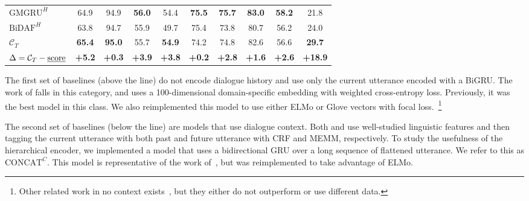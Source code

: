 \begin{table}[!htp]
\begin{center}
{\begin{tabular}{lccccccccc}
$\text{GMGRU}^{H}$                             & 64.9                 & 94.9                 & {\bf 56.0}           & 54.4             & {\bf 75.5}       & {\bf 75.7}       & {\bf 83.0}       & {\bf 58.2}       & 21.8             \\
$\text{BiDAF}^{H}$                             & 63.8                 & 94.7                 & 55.9                 & 49.7             & 75.4             & 73.8             & 80.7             & 56.2             & 24.0             \\ \midrule
$\mathcal{C}_{T}$                              & {\bf 65.4}           & {\bf 95.0}           & 55.7                 & {\bf 54.9}       & 74.2             & 74.8             & 82.6             & 56.6             & {\bf 29.7}       \\
$\Delta=\mathcal{C}_{T} - \text{\underline{score}}$ & {\bf +5.2} & {\bf +0.3} & {\bf +3.9} & {\bf +3.8} & {\bf +0.2} & {\bf +2.8} & {\bf +1.6} & {\bf +2.6} & {\bf +18.9}                                                                                                \\ \hline
\bottomrule
\end{tabular}}
\end{center}
\end{table}

The first set of baselines (above the line) do not encode dialogue
history and use only the current utterance encoded with a BiGRU. The
work of \citet{xiao2016behavioral} falls in this category, and uses a
100-dimensional domain-specific embedding with weighted cross-entropy
loss. Previously, it was the best model in this class. We also
reimplemented this model to use either ELMo or Glove vectors with
focal loss.~\footnote{Other related work in no context
  exists~\citep[\eg,][]{perez2017predicting, gibson2017attention}, but
  they either do not outperform \citet{xiao2016behavioral} or use
  different data.}

The second set of baselines (below the line) are models that use
dialogue context.  Both \citet{can2015dialog} and
\citet{tanana2016comparison} use well-studied linguistic features and
then tagging the current utterance with both past and future utterance
with CRF and MEMM, respectively. To study the usefulness of the
hierarchical encoder, we implemented a model that uses a bidirectional
GRU over a long sequence of flattened utterance. We refer to this as
$\text{CONCAT}^{C}$. This model is representative of the work
of~\citet{huang2018modeling}, but was reimplemented to take advantage
of ELMo.




